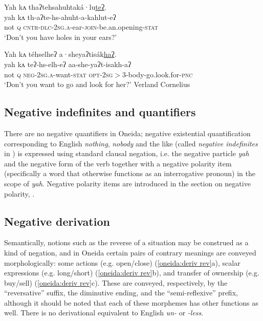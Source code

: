 \documentclass[output=paper,colorlinks,citecolor=brown]{langscibook}
\begin{document}
\ea\label{oneida:neg reply d} 
    \glll Yah kʌ thaʔtehsahuhtaká·lu\uline{teʔ}.   \\
    yah kʌ th-aʔte-hs-ahuht-a-kahlut-eʔ   \\
    not \textsc{q} \textsc{cntr-dlc-2sg.a}-ear-\textsc{join}-be.an.opening-\textsc{stat} \\
    \glt `Don't you have holes in your ears?' \citep[83]{MichelsonDoxtator2002}
\z

\ea\label{oneida:neg reply e} 
    \glll Yah kʌ téhselheʔ a·sheyaʔtisák\uline{haʔ}.   \\
    yah kʌ teʔ-hs-elh-eʔ aa-she-yaʔt-isakh-aʔ   \\
    not \textsc{q} \textsc{neg-2sg.a}-want-\textsc{stat} \textsc{opt-2sg$>$3}-body-go.look.for-\textsc{pnc} \\
    \glt `Don't you want to go and look for her?' Verland Cornelius \citep[69 (45)]{MichelsonEtAl2016}
\z

\subsection{Negative indefinites and quantifiers}
\label{oneida:sec:indef}

There are no negative quantifiers in Oneida; negative existential quantification corresponding to English \textit{nothing}, \textit{nobody} and the like (called  \textit{negative indefinites} in \citealt[194]{Haspelmath1997}) is expressed using standard clausal negation, i.e. the negative particle \textit{yah} and the negative form of the verb together with a negative polarity item (specifically a word that otherwise functions as an interrogative pronoun) in the scope of \textit{yah}.
Negative polarity items are introduced in the section on negative polarity, .
 
\subsection{Negative derivation}
\label{oneida:sec:deriv}

Semantically, notions such as the reverse of a situation may be construed as a kind of negation, and in Oneida certain pairs of  contrary meanings are conveyed morphologically: some actions (e.g. open/close) (\ref{oneida:deriv rev}a), scalar expressions (e.g. long/short) (\ref{oneida:deriv rev}b), and transfer of ownership (e.g. buy/sell) (\ref{oneida:deriv rev}c). These are conveyed, respectively, by the ``reversative'' suffix, the diminutive ending, and the ``semi-reflexive'' prefix, although it should be noted that each of these morphemes has other functions as well. There is no derivational equivalent to English \textit{un-} or \textit{-less}. 
\end{document}
